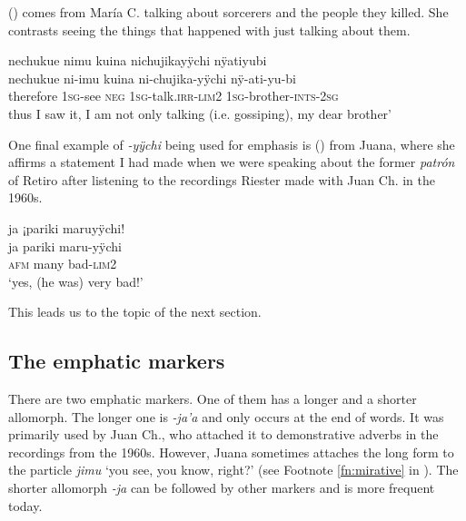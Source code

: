 
() comes from María C. talking about sorcerers and the people they killed. She contrasts seeing the things that happened with just talking about them.

\ea\label{ex:lim2-5}
\begingl
\glpreamble nechukue nimu kuina nichujikayÿchi nÿatiyubi\\
\gla nechukue ni-imu kuina ni-chujika-yÿchi nÿ-ati-yu-bi\\
\glb therefore 1\textsc{sg}-see \textsc{neg} 1\textsc{sg}-talk.\textsc{irr}-\textsc{lim}2 1\textsc{sg}-brother-\textsc{ints}-2\textsc{sg}\\
\glft thus I saw it, I am not only talking (i.e. gossiping), my dear brother’
\endgl
\trailingcitation{[ump-p110815sf.498]}
\xe

One final example of \textit{-yÿchi} being used for emphasis is () from Juana, where she affirms a statement I had made when we were speaking about the former \textit{patrón} of Retiro after listening to the recordings Riester made with Juan Ch. in the 1960s.

\ea\label{ex:lim2-6}
\begingl
\glpreamble ja ¡pariki maruyÿchi!\\
\gla ja pariki maru-yÿchi\\
\glb \textsc{afm} many bad-\textsc{lim}2\\
\glft ‘yes, (he was) very bad!’
\endgl
\trailingcitation{[jxx-p120430l-2.023-024]}
\xe

This leads us to the topic of the next section.

\subsection{The emphatic markers}\label{sec:EmphMarker}

There are two emphatic markers. One of them has a longer and a shorter allomorph. The longer one is \textit{-ja’a} and only occurs at the end of words. It was primarily used by Juan Ch., who attached it to demonstrative adverbs in the recordings from the 1960s. However, Juana sometimes attaches the long form to the  particle \textit{jimu} ‘you see, you know, right?’ (see Footnote \ref{fn:mirative} in ). The shorter allomorph \textit{-ja} can be followed by other markers and is more frequent today. 

